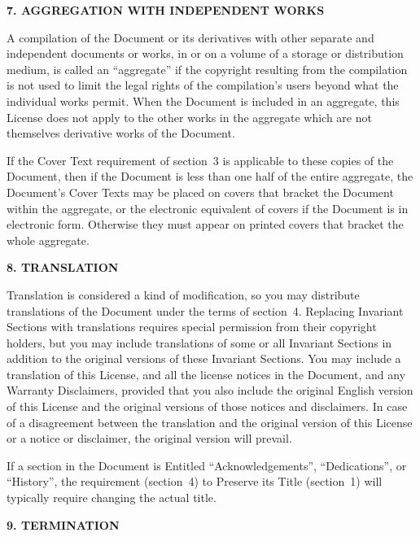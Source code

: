 \documentclass[onecolumn,a4paper]{article}
\numberwithin{equation}{section}
\begin{document}
\begin{center}
{\Large\bf 7. AGGREGATION WITH INDEPENDENT WORKS\par}
\end{center}


A compilation of the Document or its derivatives with other separate
and independent documents or works, in or on a volume of a storage or
distribution medium, is called an ``aggregate'' if the copyright
resulting from the compilation is not used to limit the legal rights
of the compilation's users beyond what the individual works permit.
When the Document is included in an aggregate, this License does not
apply to the other works in the aggregate which are not themselves
derivative works of the Document.

If the Cover Text requirement of section~3 is applicable to these
copies of the Document, then if the Document is less than one half of
the entire aggregate, the Document's Cover Texts may be placed on
covers that bracket the Document within the aggregate, or the
electronic equivalent of covers if the Document is in electronic form.
Otherwise they must appear on printed covers that bracket the whole
aggregate.


\begin{center}
{\Large\bf 8. TRANSLATION\par}
\end{center}


Translation is considered a kind of modification, so you may
distribute translations of the Document under the terms of section~4.
Replacing Invariant Sections with translations requires special
permission from their copyright holders, but you may include
translations of some or all Invariant Sections in addition to the
original versions of these Invariant Sections.  You may include a
translation of this License, and all the license notices in the
Document, and any Warranty Disclaimers, provided that you also include
the original English version of this License and the original versions
of those notices and disclaimers.  In case of a disagreement between
the translation and the original version of this License or a notice
or disclaimer, the original version will prevail.

If a section in the Document is Entitled ``Acknowledgements'',
``Dedications'', or ``History'', the requirement (section~4) to Preserve
its Title (section~1) will typically require changing the actual
title.


\begin{center}
{\Large\bf 9. TERMINATION\par}
\end{center}
\end{document}
